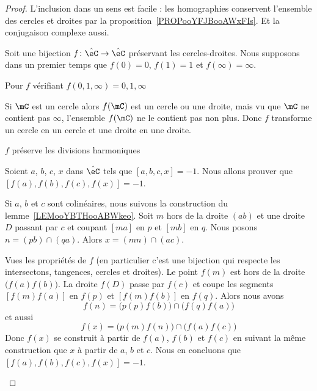 \begin{proof}
    L'inclusion dans un sens est facile : les homographies conservent l'ensemble des cercles et droites par la proposition~\ref{PROPooYFJBooAWxFIs}. Et la conjugaison complexe aussi.

    Soit une bijection \( f\colon \hat \eC\to \hat\eC\) préservant les cercles-droites. Nous supposons dans un premier temps que \( f(0)=0\), \( f(1)=1\) et \( f(\infty)=\infty\).

    \begin{subproof}
        \item[Pour \( f\) vérifiant \( f(0,1,\infty)=0,1,\infty\)]

            Si \( \mC\) est un cercle alors \( f(\mC)\) est un cercle ou une droite, mais vu que \( \mC\) ne contient pas \( \infty\), l'ensemble \( f(\mC)\) ne le contient pas non plus. Donc \( f\) transforme un cercle en un cercle et une droite en une droite.

            \begin{subproof}
                \item[\( f\) préserve les divisions harmoniques]

                    Soient \( a\), \( b\), \( c\), \( x\) dans \( \hat\eC\) tels que \( [a,b,c,x]=-1\). Nous allons prouver que \( [f(a),f(b),f(c),f(x)]=-1\).


                    Si \( a\), \( b\) et \( c\) sont colinéaires, nous suivons la construction du lemme~\ref{LEMooYBTHooABWkeo}. Soit \( m\) hors de la droite \( (ab)\) et une droite \( D\) passant par \( c\) et coupant \( [ma]\) en \( p\) et \( [mb]\) en \( q\). Nous posons \( n=(pb)\cap(qa)\). Alors \( x=(mn)\cap(ac)\).

                            Vues les propriétés de \( f\) (en particulier c'est une bijection qui respecte les intersectons, tangences, cercles et droites). Le point \( f(m)\) est hors de la droite \( \big( f(a)f(b) \big)\). La droite \( f(D)\) passe par \( f(c)\) et coupe les segments \( [f(m)f(a)]\) en \( f(p)\) et \( [f(m)f(b)]\) en \( f(q)\). Alors nous avons
                            \begin{equation}
                                f(n)=\big( p(p)f(b) \big)\cap\big( f(q)f(a) \big)
                            \end{equation}
                            et aussi
                            \begin{equation}
                                f(x)=\big( p(m)f(n) \big)\cap\big( f(a)f(c) \big)
                            \end{equation}
                            Donc \( f(x)\) se construit à partir de \( f(a)\), \( f(b)\) et \( f(c)\) en suivant la même construction que \( x\) à partir de \( a\), \( b\) et \( c\). Nous en concluons que \( [f(a), f(b),f(c),f(x)]=-1\).


\end{subproof}
\end{subproof}
\end{proof}
